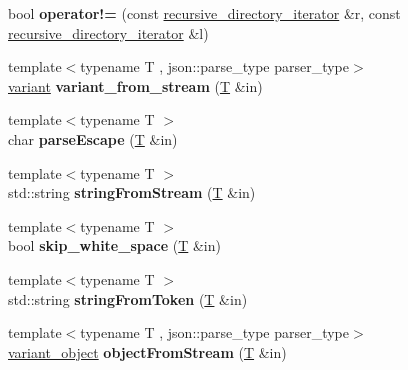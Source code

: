 \begin{DoxyCompactItemize}
bool {\bfseries operator!=} (const \mbox{\hyperlink{classfc_1_1recursive__directory__iterator}{recursive\+\_\+directory\+\_\+iterator}} \&r, const \mbox{\hyperlink{classfc_1_1recursive__directory__iterator}{recursive\+\_\+directory\+\_\+iterator}} \&l)
\item 
\mbox{\label{namespacefc_ae1eb22628e664f3cae368de7a30d5248}} 
{\footnotesize template$<$typename T , json\+::parse\+\_\+type parser\+\_\+type$>$ }\\\mbox{\hyperlink{classfc_1_1variant}{variant}} {\bfseries variant\+\_\+from\+\_\+stream} (\mbox{\hyperlink{struct_t}{T}} \&in)
\item 
\mbox{\label{namespacefc_a14df350f499648f14f6314a87800f3c5}} 
{\footnotesize template$<$typename T $>$ }\\char {\bfseries parse\+Escape} (\mbox{\hyperlink{struct_t}{T}} \&in)
\item 
\mbox{\label{namespacefc_a3a42171e4b78e7fb2dfab0eaf45dc762}} 
{\footnotesize template$<$typename T $>$ }\\std\+::string {\bfseries string\+From\+Stream} (\mbox{\hyperlink{struct_t}{T}} \&in)
\item 
\mbox{\label{namespacefc_aa2bf8a06a5740fdc38da162192bb1f5a}} 
{\footnotesize template$<$typename T $>$ }\\bool {\bfseries skip\+\_\+white\+\_\+space} (\mbox{\hyperlink{struct_t}{T}} \&in)
\item 
\mbox{\label{namespacefc_a233581b53962f2a0925100f06e89bfc1}} 
{\footnotesize template$<$typename T $>$ }\\std\+::string {\bfseries string\+From\+Token} (\mbox{\hyperlink{struct_t}{T}} \&in)
\item 
\mbox{\label{namespacefc_a811a2b58af76ddde61b624469de88cd6}} 
{\footnotesize template$<$typename T , json\+::parse\+\_\+type parser\+\_\+type$>$ }\\\mbox{\hyperlink{classfc_1_1variant__object}{variant\+\_\+object}} {\bfseries object\+From\+Stream} (\mbox{\hyperlink{struct_t}{T}} \&in)
\item 
\mbox{\label{namespacefc_a2e46d140aa0ee5f7785833f68de1ef6f}} 

\end{DoxyCompactItemize}
